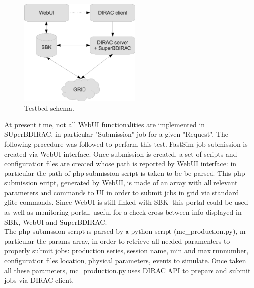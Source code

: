 \documentclass[a4paper]{jpconf}
\begin{document}
\begin{figure}[h]
\includegraphics[width=14pc]{img/testbed.eps}\hspace{2pc}%
\begin{minipage}[b]{14pc}\caption{\label{label}Testbed schema.}
\end{minipage}
\end{figure}

At present time, not all WebUI functionalities are implemented in SUperBDIRAC, in particular "Submission" job for a given "Request".
The following procedure was followed to perform this test. FastSim job submission is created via WebUI interface. Once submission is created, a set of scripts and configuration files are created whose path is reported by WebUI interface: in particular the path of php submission script is taken to be be parsed. This php submission script, generated by WebUI, is made of an array with all relevant parameters and commands to UI in order to submit jobs in grid via standard glite commands.
Since WebUI is still linked with SBK, this portal could be used as well as monitoring portal, useful for a check-cross between info displayed in SBK, WebUI and SuperBDIRAC.\\

The php submission script is parsed by a python script (mc\_production.py), in particular the params array, in order to retrieve all needed paramenters to properly submit jobs: production series, session name, min and max runnumber, configuration files location, physical parameters, events to simulate. Once taken all these parameters, mc\_production.py uses DIRAC API to prepare and submit jobs via DIRAC client.
\end{document}
